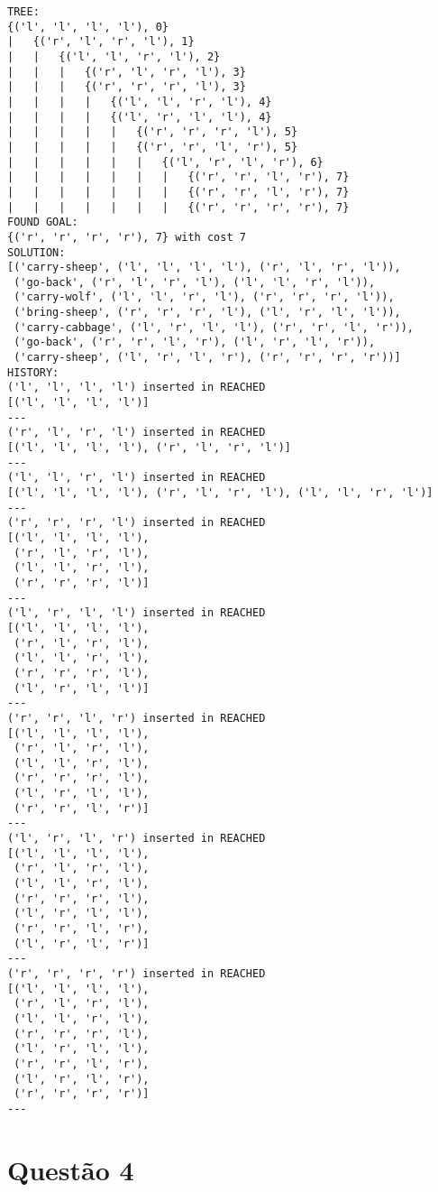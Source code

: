 \documentclass{article}
\begin{document}
\begin{verbatim}
TREE:
{('l', 'l', 'l', 'l'), 0}
|   {('r', 'l', 'r', 'l'), 1}
|   |   {('l', 'l', 'r', 'l'), 2}
|   |   |   {('r', 'l', 'r', 'l'), 3}
|   |   |   {('r', 'r', 'r', 'l'), 3}
|   |   |   |   {('l', 'l', 'r', 'l'), 4}
|   |   |   |   {('l', 'r', 'l', 'l'), 4}
|   |   |   |   |   {('r', 'r', 'r', 'l'), 5}
|   |   |   |   |   {('r', 'r', 'l', 'r'), 5}
|   |   |   |   |   |   {('l', 'r', 'l', 'r'), 6}
|   |   |   |   |   |   |   {('r', 'r', 'l', 'r'), 7}
|   |   |   |   |   |   |   {('r', 'r', 'l', 'r'), 7}
|   |   |   |   |   |   |   {('r', 'r', 'r', 'r'), 7}
FOUND GOAL:
{('r', 'r', 'r', 'r'), 7} with cost 7
SOLUTION:
[('carry-sheep', ('l', 'l', 'l', 'l'), ('r', 'l', 'r', 'l')),
 ('go-back', ('r', 'l', 'r', 'l'), ('l', 'l', 'r', 'l')),
 ('carry-wolf', ('l', 'l', 'r', 'l'), ('r', 'r', 'r', 'l')),
 ('bring-sheep', ('r', 'r', 'r', 'l'), ('l', 'r', 'l', 'l')),
 ('carry-cabbage', ('l', 'r', 'l', 'l'), ('r', 'r', 'l', 'r')),
 ('go-back', ('r', 'r', 'l', 'r'), ('l', 'r', 'l', 'r')),
 ('carry-sheep', ('l', 'r', 'l', 'r'), ('r', 'r', 'r', 'r'))]
HISTORY:
('l', 'l', 'l', 'l') inserted in REACHED
[('l', 'l', 'l', 'l')]
---
('r', 'l', 'r', 'l') inserted in REACHED
[('l', 'l', 'l', 'l'), ('r', 'l', 'r', 'l')]
---
('l', 'l', 'r', 'l') inserted in REACHED
[('l', 'l', 'l', 'l'), ('r', 'l', 'r', 'l'), ('l', 'l', 'r', 'l')]
---
('r', 'r', 'r', 'l') inserted in REACHED
[('l', 'l', 'l', 'l'),
 ('r', 'l', 'r', 'l'),
 ('l', 'l', 'r', 'l'),
 ('r', 'r', 'r', 'l')]
---
('l', 'r', 'l', 'l') inserted in REACHED
[('l', 'l', 'l', 'l'),
 ('r', 'l', 'r', 'l'),
 ('l', 'l', 'r', 'l'),
 ('r', 'r', 'r', 'l'),
 ('l', 'r', 'l', 'l')]
---
('r', 'r', 'l', 'r') inserted in REACHED
[('l', 'l', 'l', 'l'),
 ('r', 'l', 'r', 'l'),
 ('l', 'l', 'r', 'l'),
 ('r', 'r', 'r', 'l'),
 ('l', 'r', 'l', 'l'),
 ('r', 'r', 'l', 'r')]
---
('l', 'r', 'l', 'r') inserted in REACHED
[('l', 'l', 'l', 'l'),
 ('r', 'l', 'r', 'l'),
 ('l', 'l', 'r', 'l'),
 ('r', 'r', 'r', 'l'),
 ('l', 'r', 'l', 'l'),
 ('r', 'r', 'l', 'r'),
 ('l', 'r', 'l', 'r')]
---
('r', 'r', 'r', 'r') inserted in REACHED
[('l', 'l', 'l', 'l'),
 ('r', 'l', 'r', 'l'),
 ('l', 'l', 'r', 'l'),
 ('r', 'r', 'r', 'l'),
 ('l', 'r', 'l', 'l'),
 ('r', 'r', 'l', 'r'),
 ('l', 'r', 'l', 'r'),
 ('r', 'r', 'r', 'r')]
---
\end{verbatim}

\newpage

\section{Questão 4}
\end{document}
